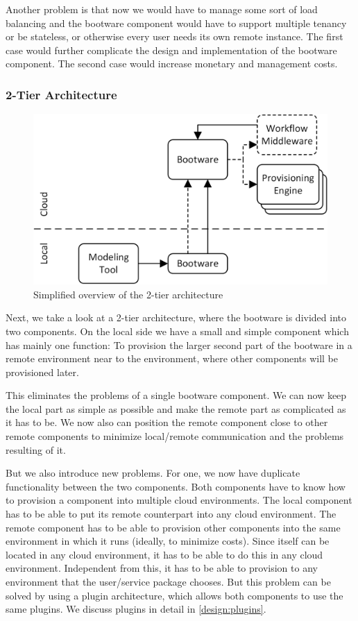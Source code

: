 Another problem is that now we would have to manage some sort of load balancing and the bootware component would have to support multiple tenancy or be stateless, or otherwise every user needs its own remote instance.
The first case would further complicate the design and implementation of the bootware component.
The second case would increase monetary and management costs.

\subsubsection{2-Tier Architecture}
\label{design:division:2tier}

\begin{figure}[!htbp]
	\centering
	\includegraphics[resolution=600]{design/assets/simple_2_tier}
	\caption{Simplified overview of the 2-tier architecture}
	\label{image:single_2_tier}
\end{figure}

Next, we take a look at a 2-tier architecture, where the bootware is divided into two components.
On the local side we have a small and simple component which has mainly one function: To provision the larger second part of the bootware in a remote environment near to the environment, where other components will be provisioned later.

This eliminates the problems of a single bootware component.
We can now keep the local part as simple as possible and make the remote part as complicated as it has to be.
We now also can position the remote component close to other remote components to minimize local/remote communication and the problems resulting of it.

But we also introduce new problems.
For one, we now have duplicate functionality between the two components.
Both components have to know how to provision a component into multiple cloud environments.
The local component has to be able to put its remote counterpart into any cloud environment.
The remote component has to be able to provision other components into the same environment in which it runs (ideally, to minimize costs).
Since itself can be located in any cloud environment, it has to be able to do this in any cloud environment.
Independent from this, it has to be able to provision to any environment that the user/service package chooses.
But this problem can be solved by using a plugin architecture, which allows both components to use the same plugins.
We discuss plugins in detail in \autoref{design:plugins}.

